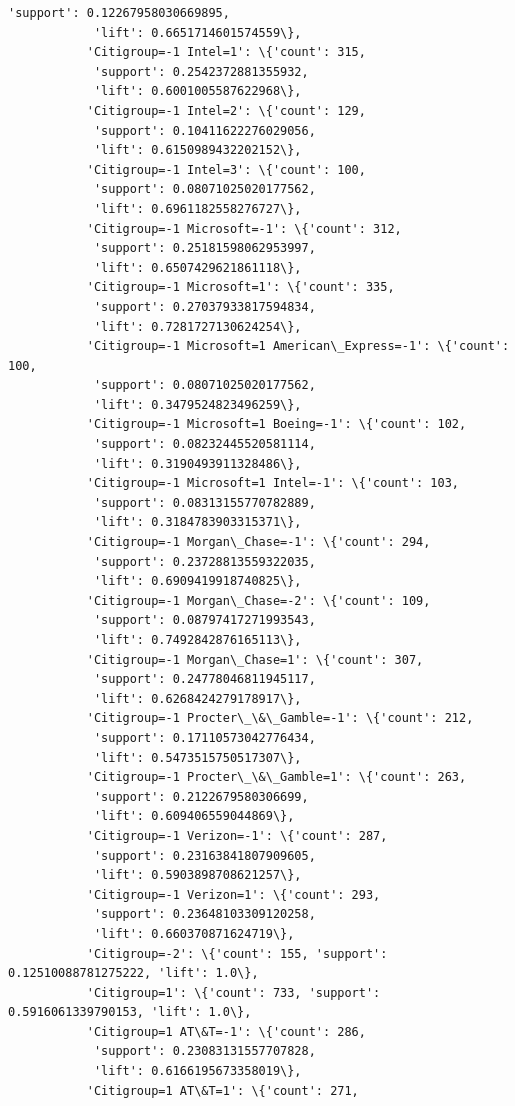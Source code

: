 \documentclass[11pt]{article}
\begin{document}
\begin{Verbatim}[commandchars=\\\{\}]
            'support': 0.12267958030669895,
            'lift': 0.6651714601574559\},
           'Citigroup=-1 Intel=1': \{'count': 315,
            'support': 0.2542372881355932,
            'lift': 0.6001005587622968\},
           'Citigroup=-1 Intel=2': \{'count': 129,
            'support': 0.10411622276029056,
            'lift': 0.6150989432202152\},
           'Citigroup=-1 Intel=3': \{'count': 100,
            'support': 0.08071025020177562,
            'lift': 0.6961182558276727\},
           'Citigroup=-1 Microsoft=-1': \{'count': 312,
            'support': 0.25181598062953997,
            'lift': 0.6507429621861118\},
           'Citigroup=-1 Microsoft=1': \{'count': 335,
            'support': 0.27037933817594834,
            'lift': 0.7281727130624254\},
           'Citigroup=-1 Microsoft=1 American\_Express=-1': \{'count': 100,
            'support': 0.08071025020177562,
            'lift': 0.3479524823496259\},
           'Citigroup=-1 Microsoft=1 Boeing=-1': \{'count': 102,
            'support': 0.08232445520581114,
            'lift': 0.3190493911328486\},
           'Citigroup=-1 Microsoft=1 Intel=-1': \{'count': 103,
            'support': 0.08313155770782889,
            'lift': 0.3184783903315371\},
           'Citigroup=-1 Morgan\_Chase=-1': \{'count': 294,
            'support': 0.23728813559322035,
            'lift': 0.6909419918740825\},
           'Citigroup=-1 Morgan\_Chase=-2': \{'count': 109,
            'support': 0.08797417271993543,
            'lift': 0.7492842876165113\},
           'Citigroup=-1 Morgan\_Chase=1': \{'count': 307,
            'support': 0.24778046811945117,
            'lift': 0.6268424279178917\},
           'Citigroup=-1 Procter\_\&\_Gamble=-1': \{'count': 212,
            'support': 0.17110573042776434,
            'lift': 0.5473515750517307\},
           'Citigroup=-1 Procter\_\&\_Gamble=1': \{'count': 263,
            'support': 0.2122679580306699,
            'lift': 0.609406559044869\},
           'Citigroup=-1 Verizon=-1': \{'count': 287,
            'support': 0.23163841807909605,
            'lift': 0.5903898708621257\},
           'Citigroup=-1 Verizon=1': \{'count': 293,
            'support': 0.23648103309120258,
            'lift': 0.660370871624719\},
           'Citigroup=-2': \{'count': 155, 'support': 0.12510088781275222, 'lift': 1.0\},
           'Citigroup=1': \{'count': 733, 'support': 0.5916061339790153, 'lift': 1.0\},
           'Citigroup=1 AT\&T=-1': \{'count': 286,
            'support': 0.23083131557707828,
            'lift': 0.6166195673358019\},
           'Citigroup=1 AT\&T=1': \{'count': 271,

\end{Verbatim}
\end{document}
